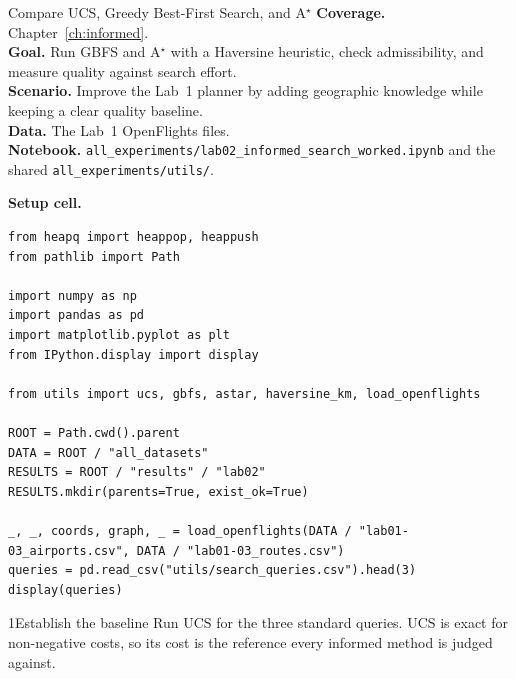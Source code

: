 
\begin{labproject}{Compare UCS, Greedy Best-First Search, and A$^\star$}
\textbf{Coverage.} Chapter~\ref{ch:informed}.\\
\textbf{Goal.} Run GBFS and A$^\star$ with a Haversine heuristic, check admissibility, and measure quality against search effort.\\
\textbf{Scenario.} Improve the Lab~1 planner by adding geographic knowledge while keeping a clear quality baseline.\\
\textbf{Data.} The Lab~1 OpenFlights files.\\
\textbf{Notebook.} \texttt{all\_experiments/lab02\_informed\_search\_worked.ipynb} and the shared \texttt{all\_experiments/utils/}.
\end{labproject}

\noindent\textbf{Setup cell.}
\begin{lstlisting}[style=utppython]
from heapq import heappop, heappush
from pathlib import Path

import numpy as np
import pandas as pd
import matplotlib.pyplot as plt
from IPython.display import display

from utils import ucs, gbfs, astar, haversine_km, load_openflights

ROOT = Path.cwd().parent
DATA = ROOT / "all_datasets"
RESULTS = ROOT / "results" / "lab02"
RESULTS.mkdir(parents=True, exist_ok=True)

_, _, coords, graph, _ = load_openflights(DATA / "lab01-03_airports.csv", DATA / "lab01-03_routes.csv")
queries = pd.read_csv("utils/search_queries.csv").head(3)
display(queries)
\end{lstlisting}

\begin{labquestion}{1}{Establish the baseline}
Run UCS for the three standard queries. UCS is exact for non-negative costs, so its cost is the reference every informed method is judged against.
\end{labquestion}

